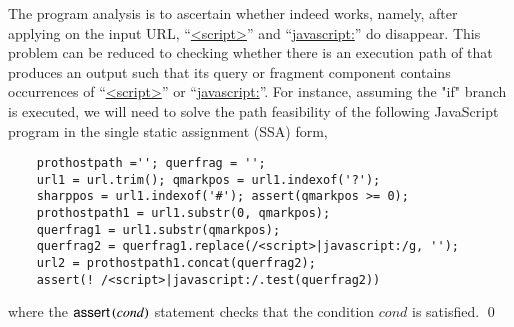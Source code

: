 \begin{example}
The program analysis is to ascertain whether {\urlxsssanitise} indeed works, namely, after applying {\urlxsssanitise} on the input URL, ``\url{<script>}'' and ``\url{javascript:}'' do disappear.  This problem can be reduced to checking whether there is an execution path of {\urlxsssanitise} that produces an output such that its query or fragment component contains occurrences of ``\url{<script>}'' or ``\url{javascript:}''. For instance, assuming  the "if" branch is executed, %
we will need to solve the path feasibility of the following JavaScript program in the single static assignment (SSA) form,

{\small
\begin{verbatim}
    prothostpath =''; querfrag = '';
    url1 = url.trim(); qmarkpos = url1.indexof('?');
    sharppos = url1.indexof('#'); assert(qmarkpos >= 0); 
    prothostpath1 = url1.substr(0, qmarkpos);
    querfrag1 = url1.substr(qmarkpos);
    querfrag2 = querfrag1.replace(/<script>|javascript:/g, '');
    url2 = prothostpath1.concat(querfrag2);
    assert(! /<script>|javascript:/.test(querfrag2))
\end{verbatim}
}
where the $\textsf{assert}\left(cond\right)$ statement checks that the condition $cond$ is satisfied. \qed
\end{example}